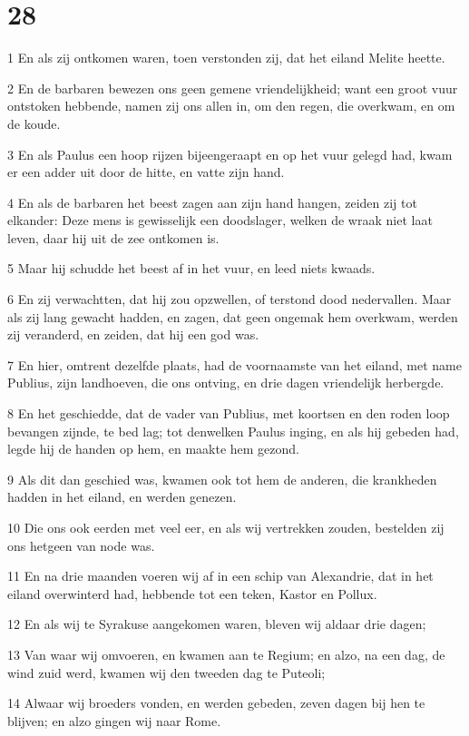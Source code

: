 \chapter{28}

\par 1 En als zij ontkomen waren, toen verstonden zij, dat het eiland Melite heette.
\par 2 En de barbaren bewezen ons geen gemene vriendelijkheid; want een groot vuur ontstoken hebbende, namen zij ons allen in, om den regen, die overkwam, en om de koude.
\par 3 En als Paulus een hoop rijzen bijeengeraapt en op het vuur gelegd had, kwam er een adder uit door de hitte, en vatte zijn hand.
\par 4 En als de barbaren het beest zagen aan zijn hand hangen, zeiden zij tot elkander: Deze mens is gewisselijk een doodslager, welken de wraak niet laat leven, daar hij uit de zee ontkomen is.
\par 5 Maar hij schudde het beest af in het vuur, en leed niets kwaads.
\par 6 En zij verwachtten, dat hij zou opzwellen, of terstond dood nedervallen. Maar als zij lang gewacht hadden, en zagen, dat geen ongemak hem overkwam, werden zij veranderd, en zeiden, dat hij een god was.
\par 7 En hier, omtrent dezelfde plaats, had de voornaamste van het eiland, met name Publius, zijn landhoeven, die ons ontving, en drie dagen vriendelijk herbergde.
\par 8 En het geschiedde, dat de vader van Publius, met koortsen en den roden loop bevangen zijnde, te bed lag; tot denwelken Paulus inging, en als hij gebeden had, legde hij de handen op hem, en maakte hem gezond.
\par 9 Als dit dan geschied was, kwamen ook tot hem de anderen, die krankheden hadden in het eiland, en werden genezen.
\par 10 Die ons ook eerden met veel eer, en als wij vertrekken zouden, bestelden zij ons hetgeen van node was.
\par 11 En na drie maanden voeren wij af in een schip van Alexandrie, dat in het eiland overwinterd had, hebbende tot een teken, Kastor en Pollux.
\par 12 En als wij te Syrakuse aangekomen waren, bleven wij aldaar drie dagen;
\par 13 Van waar wij omvoeren, en kwamen aan te Regium; en alzo, na een dag, de wind zuid werd, kwamen wij den tweeden dag te Puteoli;
\par 14 Alwaar wij broeders vonden, en werden gebeden, zeven dagen bij hen te blijven; en alzo gingen wij naar Rome.
